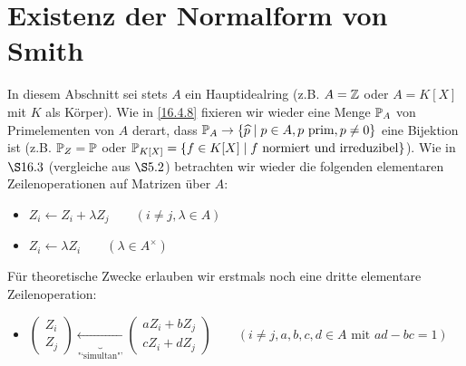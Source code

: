 \documentclass[../../main.tex]{subfiles}
\begin{document}
\section{Existenz der Normalform von Smith}

In diesem Abschnitt sei stets $A$ ein Hauptidealring (z.B. $A=\Z$ oder $A=K[X]$ mit $K$ als Körper). Wie in \ref{16.4.8} fixieren wir wieder eine Menge $\P_A$ von Primelementen von $A$ derart, dass $\P_A\to\{\tc p\mid p\in A,p\text{ prim},p\neq 0\}$ eine Bijektion ist (z.B. $\P_Z=\P$ oder $\P_{K[X]}=\{f\in K[X]\mid f\text{ normiert und irreduzibel}\}$). Wie in  $\S16.3$ (vergleiche aus $\S5.2$) betrachten wir wieder die folgenden elementaren Zeilenoperationen auf Matrizen über $A$:
\begin{itemize}
\item
$Z_i\leftarrow Z_i+\lambda Z_j
\qquad(i\neq j, \lambda\in A)$
\item
$Z_i\leftarrow \lambda Z_i\qquad(\lambda\in A^\times)$
\end{itemize}
Für theoretische Zwecke erlauben wir erstmals noch eine dritte elementare Zeilenoperation:
\begin{itemize}
\item
$\begin{pmatrix*}Z_i\\ Z_j\end{pmatrix*}\underbrace{\leftarrow}_\text{"`simultan"'} \begin{pmatrix*}aZ_i+bZ_j\\ cZ_i+dZ_j\end{pmatrix*}\qquad( i\neq j, a,b,c,d\in A\text{ mit }ad-bc=1)$\\
\end{itemize}
\end{document}

